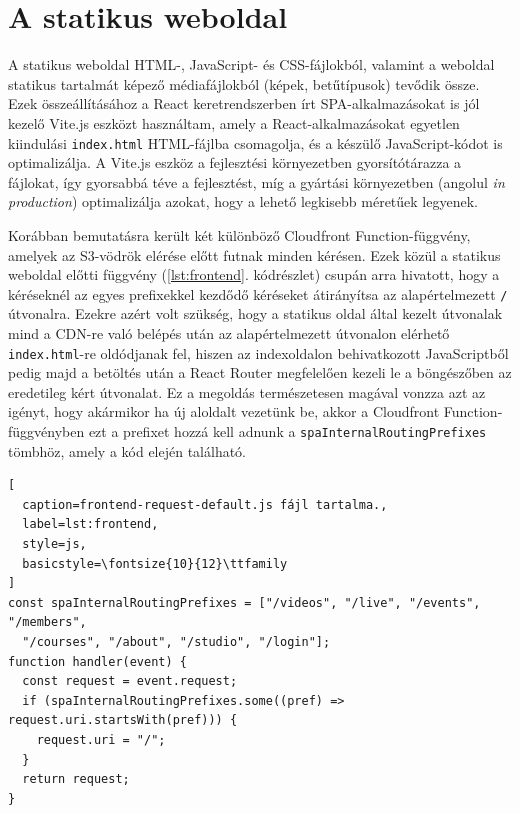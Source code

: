 \section{A statikus weboldal}

A statikus weboldal HTML-, JavaScript- és CSS-fájlokból, valamint a weboldal statikus tartalmát képező médiafájlokból (képek, betűtípusok) tevődik össze. Ezek összeállításához a React keretrendszerben írt SPA-alkalmazásokat is jól kezelő Vite.js eszközt használtam, amely a React-alkalmazásokat egyetlen kiindulási \verb|index.html| HTML-fájlba csomagolja, és a készülő JavaScript-kódot is optimalizálja. A Vite.js eszköz a fejlesztési környezetben gyorsítótárazza a fájlokat, így gyorsabbá téve a fejlesztést, míg a gyártási környezetben (angolul \emph{in production}) optimalizálja azokat, hogy a lehető legkisebb méretűek legyenek.

Korábban bemutatásra került két különböző Cloudfront Function-függvény, amelyek az S3-vödrök elérése előtt futnak minden kérésen. Ezek közül a statikus weboldal előtti függvény (\ref{lst:frontend}. kódrészlet) csupán arra hivatott, hogy a kéréseknél az egyes prefixekkel kezdődő kéréseket átirányítsa az alapértelmezett \verb|/| útvonalra. Ezekre azért volt szükség, hogy a statikus oldal által kezelt útvonalak mind a CDN-re való belépés után az alapértelmezett útvonalon elérhető \verb|index.html|-re oldódjanak fel, hiszen az indexoldalon behivatkozott JavaScriptből pedig majd a betöltés után a React Router megfelelően kezeli le a böngészőben az eredetileg kért útvonalat. Ez a megoldás természetesen magával vonzza azt az igényt, hogy akármikor ha új aloldalt vezetünk be, akkor a Cloudfront Function-függvényben ezt a prefixet hozzá kell adnunk a \verb|spaInternalRoutingPrefixes| tömbhöz, amely a kód elején található.

\begin{minipage}{0.92\textwidth}
  \begin{lstlisting}[
  caption=frontend-request-default.js fájl tartalma.,
  label=lst:frontend,
  style=js,
  basicstyle=\fontsize{10}{12}\ttfamily
]
const spaInternalRoutingPrefixes = ["/videos", "/live", "/events", "/members", 
  "/courses", "/about", "/studio", "/login"];
function handler(event) {
  const request = event.request;
  if (spaInternalRoutingPrefixes.some((pref) => request.uri.startsWith(pref))) {
    request.uri = "/";
  }
  return request;
}
\end{lstlisting}
\end{minipage}

